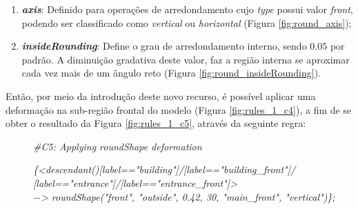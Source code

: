 \begin{enumerate}
    \item \label{itm:axis} \textbf{\textit{axis}}: Definido para operações de arredondamento cujo \textit{type} possui valor \textit{front}, podendo ser classificado como \textit{vertical} ou \textit{horizontal} (Figura \ref{fig:round_axis});
    
    \item \label{itm:insideRounding} \textbf{\textit{insideRounding}}: Define o grau de arredondamento interno, sendo $0.05$ por padrão. A diminuição gradativa deste valor, faz a região interna se aproximar cada vez mais de um ângulo reto (Figura \ref{fig:round_insideRounding}).
\end{enumerate}

\vspace{0.3cm}

Então, por meio da introdução deste novo recurso, é possível aplicar uma deformação na sub-região frontal do modelo (Figura \ref{fig:rules_1_c4}), a fim de se obter o resultado da Figura \ref{fig:rules_1_c5}, através da seguinte regra:

\vspace{0.3cm}

\begin{description}
    \item[] \qquad \textit{\#C5: Applying roundShape deformation}
    \item[] \qquad \textit{\{<descendant()[label=="building"]/[label=="building\_front"]/} \\
    \textit{[label=="entrance"]/[label=="entrance\_front"]>} \\
    \textit{$-$> roundShape("front", "outside", 0.42, 30, "main\_front", "vertical")\};}
\end{description}

\vspace{0.3cm}

\begin{figure}[h!]
	\centering
	\captionsetup{width=15cm}
	{}	
\end{figure}

